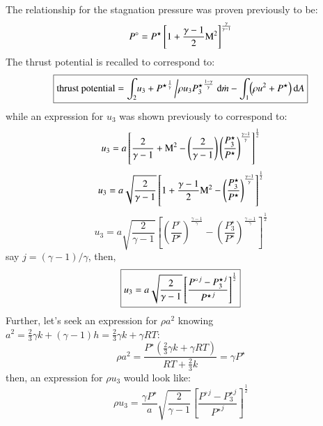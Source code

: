 \documentclass{warpdoc}
\numberwithin{equation}{section}
\newcommand{\mfd}{\displaystyle}
\newcommand{\ordi}{{\rm d}}
\newcommand{\mdot}{\dot{m}}
\newcommand\frameeqn[1]{\fbox{$#1$}}
\begin{document}
The relationship for the stagnation pressure was proven previously to be:
%
\begin{equation}
  \mfd P^\circ
  =
   P^\star \left[ 1+ \frac{\gamma-1}{2} {\rm M}^2 \right]
   ^\frac{\gamma}{\gamma-1}
\end{equation}
%
The thrust potential is recalled to correspond to:
%
\begin{equation}
 \frameeqn{
  {\rm thrust~potential}=  \mfd\int_2 \! u_{3}
 + {P^\star}^{\frac{1}{\gamma}}  \left/ \rho u_{3}{P_3^\star}^{\frac{1-\gamma}{\gamma}}
    \right.\ordi \mdot
   - \mfd\int_1 \!\left(\rho u^2 + P^\star \right) \ordi A
 }
\end{equation}
%
while an expression for $u_3$ was shown previously to correspond to:
%
\begin{equation}
   \mfd u_3
  = a \left[ \frac{2 }{\gamma-1}+{\rm M}^2
   -\left( \frac{2 }{\gamma-1} \right)
      \left(\frac{P_3^\star}{P^\star}\right)^\frac{\gamma-1}{\gamma}
    \right]^\frac{1}{2}
\end{equation}
%
%
\begin{equation}
   \mfd u_3
  = a \sqrt{\frac{2 }{\gamma-1}} \left[ 1+\frac{\gamma-1}{2}{\rm M}^2
       -\left(\frac{P_3^\star}{P^\star}\right)^\frac{\gamma-1}{\gamma}
    \right]^\frac{1}{2}
\end{equation}
%
%
\begin{equation}
   \mfd u_3
  = a \sqrt{\frac{2 }{\gamma-1}} \left[ \left(\frac{P^\circ}{P^\star} \right)^\frac{\gamma-1}{\gamma}
       -\left(\frac{P_3^\star}{P^\star}\right)^\frac{\gamma-1}{\gamma}
    \right]^\frac{1}{2}
\end{equation}
%
say $j=(\gamma-1)/\gamma$, then,
%
\begin{equation}
  \frameeqn{
   \mfd u_3
  = a \sqrt{\frac{2 }{\gamma-1}} \left[ \frac{{P^\circ}^j-{P_3^\star}^j}{{P^\star}^j}
    \right]^\frac{1}{2}
  }
\end{equation}
%
Further, let's seek an expression for $\rho a^2$ knowing
$a^2=\frac{2}{3}\gamma k+(\gamma-1) h=\frac{2}{3}\gamma k+\gamma R T$:
%
\begin{equation}
  \rho a^2 = \frac{P^\star (\frac{2}{3}\gamma k+\gamma R T)}{R T +\frac{2}{3} k}
           = \gamma P^\star
\end{equation}
%
then, an expression for $\rho u_3$ would look like:
%
\begin{equation}
   \mfd \rho u_3
  = \frac{\gamma P^\star}{a} \sqrt{\frac{2 }{\gamma-1}} \left[ \frac{{P^\circ}^j-{P_3^\star}^j}{{P^\star}^j}
    \right]^\frac{1}{2}
\end{equation}
\end{document}
